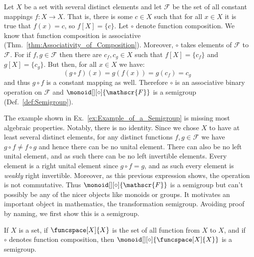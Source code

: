         \begin{example}
            \label{ex:Example_of_a_Semigroup}%
            Let $X$ be a set with several distinct elements and let
            $\mathscr{F}$ be the set of all constant mappings
            $f:X\rightarrow{X}$. That is, there is some $c\in{X}$ such that for
            all $x\in{X}$ it is true that $f(x)=c$, so $f[X]=\{c\}$. Let $\circ$
            denote function composition. We know that function composition is
            associative (Thm.~\ref{thm:Associativity_of_Composition}). Moreover,
            $\circ$ takes elements of $\mathscr{F}$ to $\mathscr{F}$. For if
            $f,g\in\mathscr{F}$ then there are $c_{f},c_{g}\in{X}$ such that
            $f[X]=\{c_{f}\}$ and $g[X]=\{c_{g}\}$. But then, for all $x\in{X}$
            we have:
            \begin{equation}
                (g\circ{f})(x)=g(f(x))=g(c_{f})=c_{g}
            \end{equation}
            and thus $g\circ{f}$ is a constant mapping as well. Therefore
            $\circ$ is an associative binary operation on $\mathscr{F}$ and
            $\monoid[][\circ]{\mathscr{F}}$ is a semigroup
            (Def.~\ref{def:Semigroup}).
        \end{example}
        The example shown in Ex.~\ref{ex:Example_of_a_Semigroup} is missing most
        algebraic properties. Notably, there is no identity. Since we chose $X$
        to have at least several distinct elements, for any distinct functions
        $f,g\in\mathscr{F}$ we have $g\circ{f}\ne{f}\circ{g}$ and hence there
        can be no unital element. There can also be no left unital element, and
        as such there can be no left invertible elements. Every element is a
        right unital element since $g\circ{f}=g$, and as such every element is
        \textit{weakly} right invertible. Moreover, as this previous expression
        shows, the operation is not commutative. Thus
        $\monoid[][\circ]{\mathscr{F}}$ is a semigroup but can't possibly be any
        of the nicer objects like monoids or groups. It motivates an important
        object in mathematics, the transformation semigroup. Avoiding proof by
        naming, we first show this is a semigroup.
        \begin{theorem}
            If $X$ is a set, if $\funcspace[X]{X}$ is the set of all function
            from $X$ to $X$, and if $\circ$ denotes function composition, then
            $\monoid[][\circ]{\funcspace[X]{X}}$ is a semigroup.
        \end{theorem}
